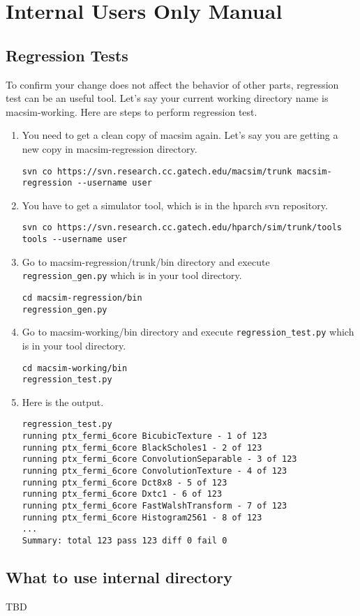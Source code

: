
\chapter{Internal Users Only Manual}
\section{Regression Tests}
\label{sec:regression}

To confirm your change does not affect the behavior of other parts,
regression test can be an useful tool. Let's say your current working
directory name is macsim-working. Here are steps to perform regression
test.

\begin{enumerate}[Step 1.]

\item You need to get a clean copy of macsim again. Let's say you are
  getting a new copy in macsim-regression directory.

\begin{Verbatim}
svn co https://svn.research.cc.gatech.edu/macsim/trunk macsim-regression --username user
\end{Verbatim}

\item You have to get a simulator tool, which is in the hparch svn
  repository.

\begin{Verbatim}
svn co https://svn.research.cc.gatech.edu/hparch/sim/trunk/tools tools --username user
\end{Verbatim}

\item Go to macsim-regression/trunk/bin directory and execute
  \Verb+regression_gen.py+ which is in your tool directory.

\begin{Verbatim}
cd macsim-regression/bin
regression_gen.py
\end{Verbatim}

\item Go to macsim-working/bin directory and execute
  \Verb+regression_test.py+ which is in your tool directory.

\begin{Verbatim}
cd macsim-working/bin
regression_test.py
\end{Verbatim}

\item Here is the output.

\begin{Verbatim}
regression_test.py
running ptx_fermi_6core BicubicTexture - 1 of 123
running ptx_fermi_6core BlackScholes1 - 2 of 123
running ptx_fermi_6core ConvolutionSeparable - 3 of 123
running ptx_fermi_6core ConvolutionTexture - 4 of 123
running ptx_fermi_6core Dct8x8 - 5 of 123
running ptx_fermi_6core Dxtc1 - 6 of 123
running ptx_fermi_6core FastWalshTransform - 7 of 123
running ptx_fermi_6core Histogram2561 - 8 of 123
...
Summary: total 123 pass 123 diff 0 fail 0
\end{Verbatim}

\end{enumerate}


\section{What to use internal directory}

TBD

